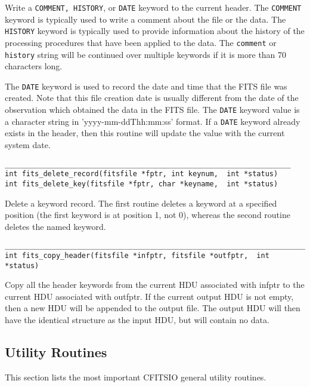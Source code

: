 \documentclass[11pt]{article}
\begin{document}
Write a {\tt COMMENT, HISTORY}, or {\tt DATE} keyword to the current
header.  The {\tt COMMENT} keyword is typically used to write a comment
about the file or the data.  The {\tt HISTORY} keyword is typically
used to provide information about the history of the processing
procedures that have been applied to the data.  The {\tt comment} or
{\tt history} string will be continued over multiple keywords if it is
more than 70 characters long.

The {\tt DATE} keyword is used to record the date and time that the
FITS file was created.  Note that this file creation date is usually
different from the date of the observation which obtained the data in
the FITS file.  The {\tt DATE} keyword value is a character string in
'yyyy-mm-ddThh:mm:ss' format. If a {\tt DATE} keyword already exists in
the header, then this routine will update the value with the current
system date.

\begin{verbatim}
___________________________________________________________________
int fits_delete_record(fitsfile *fptr, int keynum,  int *status)
int fits_delete_key(fitsfile *fptr, char *keyname,  int *status)
\end{verbatim}

Delete a keyword record. The first routine deletes a keyword at a
specified position (the first keyword is at position 1, not 0),
whereas the second routine deletes the named keyword.

\begin{verbatim}
_______________________________________________________________________
int fits_copy_header(fitsfile *infptr, fitsfile *outfptr,  int *status)
\end{verbatim}

Copy all the header keywords from the current HDU associated with
infptr to the current HDU associated with outfptr.  If the current
output HDU is not empty, then a new HDU will be appended to the output
file. The output HDU will then have the identical structure as the
input HDU, but will contain no data.

\newpage
\subsection{Utility Routines}

This section lists the most important CFITSIO general utility routines.
\end{document}
